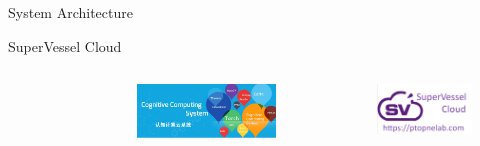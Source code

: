 \documentclass[final,hyperref={pdfpagelabels=false}]{beamer}
\begin{document}
\begin{frame}[t]
\begin{columns}[t]
\begin{column}{.445\textwidth}
\begin{block}{System Architecture}
\end{block}

\begin{block}{SuperVessel Cloud}
\begin{columns} %
\begin{column}{.3\textwidth} 
	\begin{figure}
		\includegraphics[width=0.7\linewidth]{ibm.png}
		\label{sv}
	\end{figure}
\end{column}
\begin{column}{.3\textwidth} 
	\begin{figure}
		\includegraphics[width=1.0\linewidth]{svcloud.png}
		\label{sv}
	\end{figure}
\end{column}
\begin{column}{.3\textwidth} 
	\begin{figure}
		\includegraphics[width=0.7\linewidth]{svlogo.png}
		\label{svl}
	\end{figure}
\end{column}
\end{columns}


\end{block}
\end{column}
\end{columns}
\end{frame}
\end{document}
